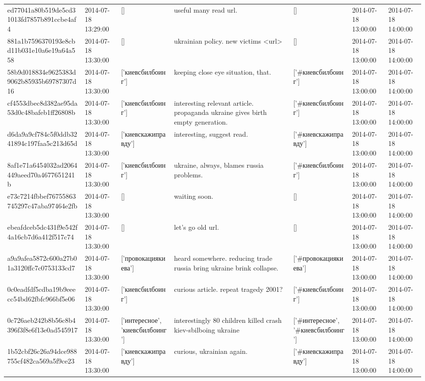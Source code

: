 \begin{tabular}{lllllll}
ed77041a80b519de5cd31013fd7857b891ccbe4af4 & 2014-07-18 13:29:00 & [] & useful many read url. & [] & 2014-07-18 13:00:00 & 2014-07-18 14:00:00 \\
881a1b7596370193e8cbd11b031e10a6e19a64a558 & 2014-07-18 13:30:00 & [] & ukrainian policy. new victims <url> & [] & 2014-07-18 13:00:00 & 2014-07-18 14:00:00 \\
58b9d018834e9625383d9062b85935b69787307d16 & 2014-07-18 13:30:00 & ['киевсбилбоинг'] & keeping close eye situation, that. & ['#киевсбилбоинг'] & 2014-07-18 13:00:00 & 2014-07-18 14:00:00 \\
cf4553dbec8d382ae95da53d0c48bafeb1ff26808b & 2014-07-18 13:30:00 & ['киевсбилбоинг'] & interesting relevant article. propaganda ukraine gives birth empty generation. & ['#киевсбилбоинг'] & 2014-07-18 13:00:00 & 2014-07-18 14:00:00 \\
d6da9a9cf784c5f0ddb3241894c197faa5c213d65d & 2014-07-18 13:30:00 & ['киевскажиправду'] & interesting, suggest read. & ['#киевскажиправду'] & 2014-07-18 13:00:00 & 2014-07-18 14:00:00 \\
8af1e71a6454032ad2064449aeed70a4677651241b & 2014-07-18 13:30:00 & ['киевсбилбоинг'] & ukraine, always, blames russia problems. & ['#киевсбилбоинг'] & 2014-07-18 13:00:00 & 2014-07-18 14:00:00 \\
e73c7214fbbef76755863745297c47aba97464e2fb & 2014-07-18 13:30:00 & [] & waiting soon. & [] & 2014-07-18 13:00:00 & 2014-07-18 14:00:00 \\
ebeafdceb5dc431f9e542f4a16cb7d6a412f517c74 & 2014-07-18 13:30:00 & [] & let's go old url. & [] & 2014-07-18 13:00:00 & 2014-07-18 14:00:00 \\
a9a9afea5872c600a27b01a3120ffc7c0753133cd7 & 2014-07-18 13:30:00 & ['провокациякиева'] & heard somewhere. reducing trade russia bring ukraine brink collapse. & ['#провокациякиева'] & 2014-07-18 13:00:00 & 2014-07-18 14:00:00 \\
0c0eadfdf5cdba19b9eeecc54bd62fbfc966bf5e06 & 2014-07-18 13:30:00 & ['киевсбилбоинг'] & curious article. repeat tragedy 2001? & ['#киевсбилбоинг'] & 2014-07-18 13:00:00 & 2014-07-18 14:00:00 \\
0c726aeb242b8b56c8b4396f3f8e6f13e0ad545917 & 2014-07-18 13:30:00 & ['интересное', 'киевсбилбоинг'] & interestingly 80 children killed crash kiev-sbilboing ukraine & ['#интересное', '#киевсбилбоинг'] & 2014-07-18 13:00:00 & 2014-07-18 14:00:00 \\
1b52cbf26c26a94dce988755cf482ca569a5f9ce23 & 2014-07-18 13:30:00 & ['киевскажиправду'] & curious, ukrainian again. & ['#киевскажиправду'] & 2014-07-18 13:00:00 & 2014-07-18 14:00:00 \\

\end{tabular}
